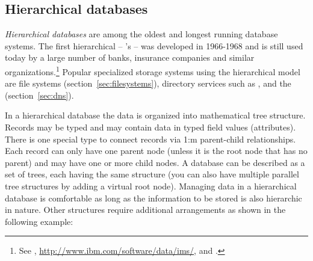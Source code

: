 



\subsection{Hierarchical databases}
\label{sec:hierarchicaldatamodel}

\textit{Hierarchical databases} are among the oldest and longest running
database systems. 
The first hierarchical  -- 's
 -- was developed in 1966-1968 and is still
used today by a large number of banks, insurance companies and similar
organizations.\footnote{See \textcite{Blackman1998},
\url{http://www.ibm.com/software/data/ims/}, and
\cite[appendix E]{Silberschatz2010}.} 
Popular specialized storage systems using the hierarchical model are file
systems (section~\ref{sec:filesystems}), directory services such as 
, and the
 (section~\ref{sec:dns}). 

In a hierarchical database the data is organized into mathematical tree structure.
Records may be typed and may contain data in typed field values (attributes).
There is one special type to connect records via 1:m parent-child relationships.
Each record can only have one parent node (unless it is the root
node that has no parent) and may have one or more child nodes. A database 
can be described as a set of trees, each having the same structure (you can also
have multiple parallel tree structures by adding a virtual root node). Managing
data in a hierarchical database is comfortable as long as the information to be
stored is also hierarchic in nature. Other structures require
additional arrangements as shown in the following example:

